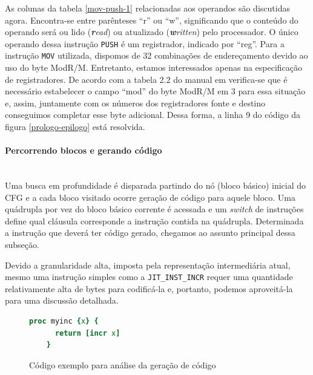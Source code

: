 
As colunas da tabela \ref{mov-push-1} relacionadas aos operandos são
discutidas agora. Encontra-se entre parênteses ``r'' ou ``w'',
significando que o conteúdo do operando será ou lido
(\textit{\textbf{r}ead}) ou atualizado
(\textit{\textbf{w}ritten}) pelo processador. O único operando dessa
instrução \verb!PUSH! é um registrador, indicado por ``reg''. Para a
instrução \verb!MOV! utilizada, dispomos de 32 combinações de
endereçamento devido ao uso do byte ModR/M. Entretanto, estamos
interessados apenas na especificação de registradores. De acordo com a
tabela 2.2 do manual em  verifica-se
que é necessário estabelecer o campo ``mod'' do byte ModR/M em 3 para
essa situação e, assim, juntamente com os números dos registradores fonte e
destino conseguimos completar esse byte adicional. Dessa forma, a
linha 9 do código da figura \ref{prologo-epilogo} está resolvida.


\paragraph{Percorrendo blocos e gerando código}
\quad \\
Uma busca em profundidade é disparada partindo do nó (bloco básico) inicial
do CFG e a cada bloco visitado ocorre geração de código para aquele
bloco. Uma quádrupla por vez do bloco básico corrente é acessada e um
\textit{switch} de instruções define qual cláusula corresponde a
instrução contida na quádrupla. Determinada a instrução que deverá ter
código gerado, chegamos ao assunto principal dessa subseção.

Devido a granularidade alta, imposta pela representação intermediária
atual, mesmo uma instrução simples como a \verb!JIT_INST_INCR! requer uma
quantidade relativamente alta de bytes para codificá-la e, portanto,
podemos aproveitá-la para uma discussão detalhada.

\begin{figure}[h]
  \centering
  \begin{lstlisting}[language=Tcl]
    proc myinc {x} {
      return [incr x]
    }
  \end{lstlisting}
  \caption{Código exemplo para análise da geração de código \label{myinc}}
\end{figure}

